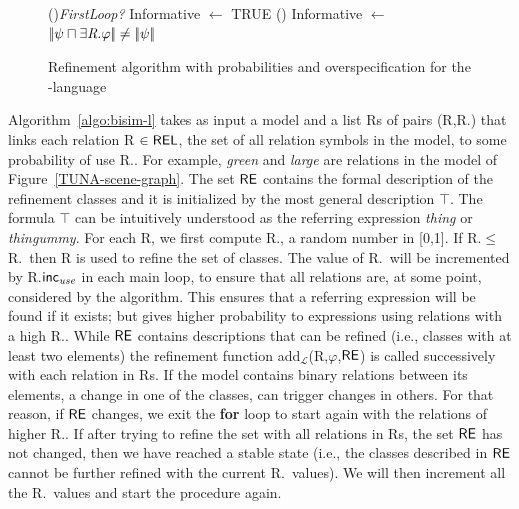 \begin{figure}[!t]
\begin{algorithm}[H]
\If(){\em FirstLoop?}{
    Informative $\leftarrow$ TRUE }
\lElse() {Informative $\leftarrow$ $|\!|\psi \sqcap \exists \mbox{\em R}.\varphi|\!| \neq |\!|\psi|\!|$} 
\end{algorithm}
\vspace*{-.3cm}\caption{Refinement algorithm with probabilities and overspecification for the \el-language}\label{fig:algo3}

\end{figure}

Algorithm~\ref{algo:bisim-l} takes as input a model and a list Rs of pairs (R,R.\puse) that links each relation R $\in \textsf{REL}$, the set of all relation symbols in the model,  to some probability of use R.\puse. For example, \emph{green} and \emph{large} are relations in the model of Figure~\ref{TUNA-scene-graph}.  
%
The set $\textsf{RE}$ contains the formal description of the refinement classes and it is initialized by the most general description $\top$. The formula $\top$ can be intuitively understood as the referring expression \emph{thing} or \emph{thingummy}.  
For each R, we first compute R.\randomuse, a random number in [0,1].  If R.\randomuse $\le$ R.\puse\ then R is used to refine the set of classes.  The value of R.\puse\ will be incremented by R.$\textsf{inc}_\emph{use}$ in each main loop, to ensure that all relations are, at some point, considered by the algorithm.  This ensures that a referring expression will be found if it exists; but gives higher probability to expressions using relations with a high R.\puse. 
While $\textsf{RE}$ contains descriptions that can be refined (i.e., classes with at least two elements) the refinement function add$_\mathcal{L}$(R,$\varphi$,$\textsf{RE}$) is called successively with each relation in Rs. If the model contains binary relations between its elements, a change in one of the classes, can trigger changes in others. For that reason, if $\textsf{RE}$ changes, we exit the \textbf{for} loop to start again with the relations of higher R.\puse. If after trying to refine the set with all relations in Rs, the set $\textsf{RE}$ has not changed, then we have reached a stable state (i.e., the classes described in $\textsf{RE}$ cannot be further refined with the current R.\puse\ values). We will then increment all the R.\puse\ values and start the procedure again. 

